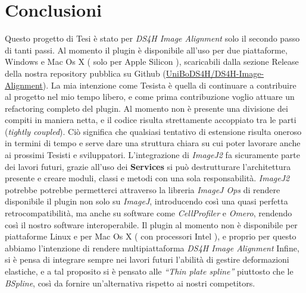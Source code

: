 \chapter{Conclusioni}
\label{chap:conclusion}
\noindent Questo progetto di Tesi è stato per \textit{DS4H Image Alignment} solo il secondo passo di tanti passi. Al momento il plugin è disponibile all'uso per due piattaforme, Windows e Mac Os X ( solo per Apple Silicon ), scaricabili dalla sezione Release della nostra repository pubblica su Github (\hyperref[https://github.com/UniBoDS4H/DS4H-Image-Alignment]{UniBoDS4H/DS4H-Image-Alignment}). La mia intenzione come Tesista è quella di continuare a contribuire al progetto nel mio tempo libero, e come prima contribuzione voglio attuare un refactoring completo del plugin. Al momento non è presente una divisione dei compiti in maniera netta, e il codice risulta strettamente accoppiato tra le parti (\textit{tightly coupled}). Ciò significa che qualsiasi tentativo di estensione risulta oneroso in termini di tempo e serve dare una struttura chiara su cui poter lavorare anche ai prossimi Tesisti e sviluppatori. L'integrazione di \textit{ImageJ2} fa sicuramente parte dei lavori futuri, grazie all'uso dei \textbf{Services} si può destrutturare l'architettura presente e creare moduli, classi e metodi con una sola responsabilità. \textit{ImageJ2} potrebbe potrebbe permetterci attraverso la libreria \textit{ImageJ Ops} di rendere disponibile il plugin non solo su \textit{ImageJ}, introducendo così una quasi perfetta retrocompatibilità, ma anche su software come \textit{CellProfiler} e \textit{Omero}, rendendo così il nostro software interoperabile. Il plugin al momento non è disponibile per piattaforme Linux e per Mac Os X ( con processori Intel ), e proprio per questo abbiamo l'intenzione di rendere multipiattaforma \textit{DS4H Image Alignment}
Infine, si è pensa di integrare sempre nei lavori futuri l'abilità di gestire deformazioni elastiche, e a tal proposito si è pensato alle \textit{``Thin plate spline''} piuttosto che le \textit{BSpline}, così da fornire un'alternativa rispetto ai nostri competitors.